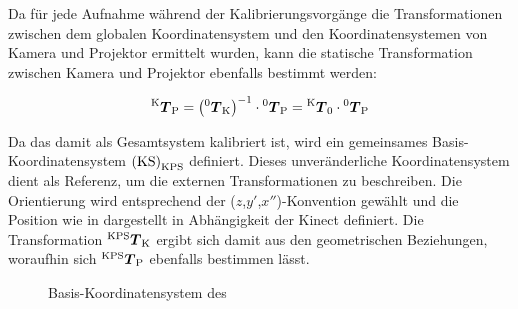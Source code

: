 Da für jede Aufnahme während der Kalibrierungsvorgänge die Transformationen zwischen dem globalen Koordinatensystem und den Koordinatensystemen von Kamera und Projektor ermittelt wurden, kann die statische Transformation zwischen Kamera und Projektor ebenfalls bestimmt werden:

\begin{equation}
{^{\mathrm{K}}\mbox{\boldmath{$T$}}_{\mathrm{P}}} = \left( {^{\mathrm{0}}\mbox{\boldmath{$T$}}_{\mathrm{K}}} \right)^{-1} \cdot {^{\mathrm{0}}\mbox{\boldmath{$T$}}_{\mathrm{P}}} = {^{\mathrm{K}}\mbox{\boldmath{$T$}}_{\mathrm{0}}} \cdot {^{\mathrm{0}}\mbox{\boldmath{$T$}}_{\mathrm{P}}}
\end{equation}

Da das \kps{} damit als Gesamtsystem kalibriert ist, wird ein gemeinsames Basis-Koordinatensystem ${\mathrm{(KS)}}_{\mathrm{KPS}}$ definiert. Dieses unveränderliche Koordinatensystem dient als Referenz, um die externen Transformationen zu beschreiben. Die Orientierung wird entsprechend der ($z$,$y'$,$x''$)-Konvention gewählt und die Position wie in  dargestellt in Abhängigkeit der Kinect definiert. Die Transformation ${^{\mathrm{KPS}}\mbox{\boldmath{$T$}}_{\mathrm{K}}}$ ergibt sich damit aus den geometrischen Beziehungen, woraufhin sich ${^{\mathrm{KPS}}\mbox{\boldmath{$T$}}_{\mathrm{P}}}$ ebenfalls bestimmen lässt.


\begin{figure}[ht]
	\begin{center}%
		\caption{Basis-Koordinatensystem des }
		\label{fig.coords_kps}
	\end{center}
\end{figure}



